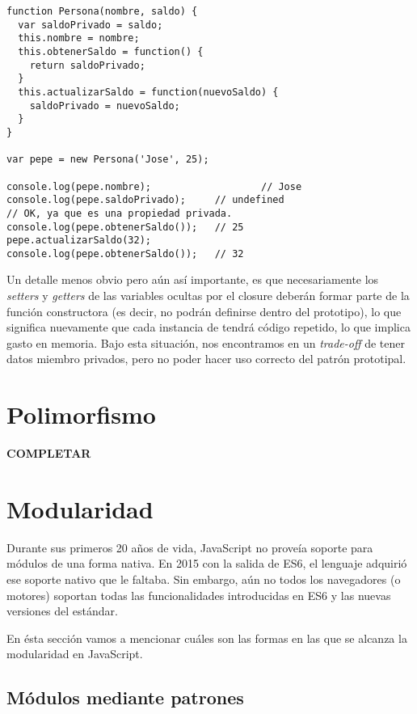 \begin{lstlisting}[title={Alcanzando variables privadas mediante closures}]
function Persona(nombre, saldo) {
  var saldoPrivado = saldo;
  this.nombre = nombre;
  this.obtenerSaldo = function() {
    return saldoPrivado;
  }
  this.actualizarSaldo = function(nuevoSaldo) {
    saldoPrivado = nuevoSaldo;
  }
}

var pepe = new Persona('Jose', 25);

console.log(pepe.nombre);					// Jose
console.log(pepe.saldoPrivado);		// undefined
// OK, ya que es una propiedad privada.
console.log(pepe.obtenerSaldo());	// 25
pepe.actualizarSaldo(32);
console.log(pepe.obtenerSaldo());	// 32
\end{lstlisting}

Un detalle menos obvio pero aún así importante, es que necesariamente los \textit{setters} y \textit{getters} de las variables ocultas por el closure deberán formar parte de la función constructora (es decir, no podrán definirse dentro del prototipo), lo que significa nuevamente que cada instancia de  tendrá código repetido, lo que implica gasto en memoria. Bajo esta situación, nos encontramos en un \textit{trade-off} de tener datos miembro privados, pero no poder hacer uso correcto del patrón prototipal.

\section{Polimorfismo}

\textbf{COMPLETAR}

\section{Modularidad}

Durante sus primeros 20 años de vida, JavaScript no proveía soporte para módulos de una forma nativa. En 2015 con la salida de ES6, el lenguaje adquirió ese soporte nativo que le faltaba. Sin embargo, aún no todos los navegadores (o motores) soportan todas las funcionalidades introducidas en ES6 y las nuevas versiones del estándar.

En ésta sección vamos a mencionar cuáles son las formas en las que se alcanza la modularidad en JavaScript.

\subsection{Módulos mediante patrones}

